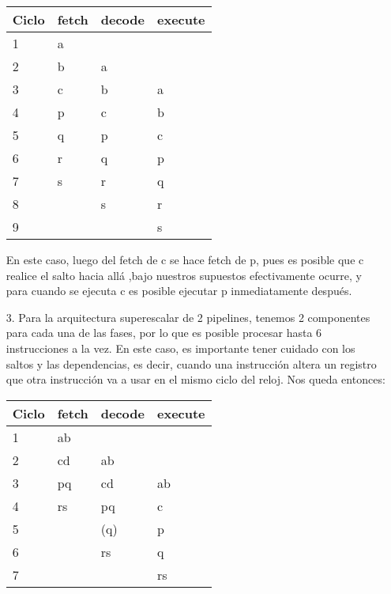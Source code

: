 \documentclass[dcc,sol]{fcfmcourse}
\begin{document}
\begin{problems}
\begin{solution}
\begin{enumerate}
        \begin{table}[h]
        \centering
        \begin{tabular}{|l|l|l|l|}
        \hline
        Ciclo & fetch & decode & execute \\ \hline
        1     & a     &        &         \\ \hline
        2     & b     & a      &         \\ \hline
        3     & c     & b      & a       \\ \hline
        4     & p     & c      & b       \\ \hline
        5     & q     & p      & c       \\ \hline
        6     & r     & q      & p       \\ \hline
        7     & s     & r      & q       \\ \hline
        8     &       & s      & r       \\ \hline
        9     &       &        & s       \\ \hline
        \end{tabular}
        \end{table}

        En este caso, luego del fetch de c se hace fetch de p, pues es posible que c realice el salto hacia allá ,bajo nuestros supuestos efectivamente ocurre, y para cuando se ejecuta c es posible ejecutar p inmediatamente después.

        \item[3.] Para la arquitectura superescalar de 2 pipelines, tenemos 2 componentes para cada una de las fases, por lo que es posible procesar hasta 6 instrucciones a la vez. En este caso, es importante tener cuidado con los saltos y las dependencias, es decir, cuando una instrucción altera un registro que otra instrucción va a usar en el mismo ciclo del reloj. Nos queda entonces:

        \begin{table}[h]
        \centering
        \begin{tabular}{|l|l|l|l|}
        \hline
        Ciclo & fetch & decode & execute \\ \hline
        1     & ab    &        &         \\ \hline
        2     & cd    & ab     &         \\ \hline
        3     & pq    & cd     & ab      \\ \hline
        4     & rs    & pq     & c       \\ \hline
        5     &       & (q)    & p       \\ \hline
        6     &       & rs     & q       \\ \hline
        7     &       &        & rs      \\ \hline
        \end{tabular}
        \end{table}


\end{enumerate}
\end{solution}
\end{problems}
\end{document}
